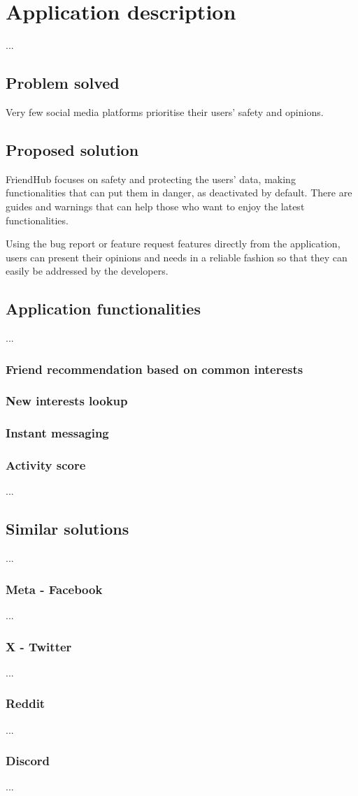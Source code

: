 \chapter{Application description}
...
    \section{Problem solved}
    Very few social media platforms prioritise their users' safety and opinions.
    
    \section{Proposed solution}
    FriendHub focuses on safety and protecting the users' data, making functionalities that can put them in danger, as deactivated by default. There are guides and warnings that can help those who want to enjoy the latest functionalities.

    Using the bug report or feature request features directly from the application, users can present their opinions and needs in a reliable fashion so that they can easily be addressed by the developers.
    \section{Application functionalities}
    ...
        \subsection{Friend recommendation based on common interests}
        \subsection{New interests lookup}
        \subsection{Instant messaging}
        \subsection{Activity score}
        ...
    \section{Similar solutions}
        ...
        \subsection{Meta - Facebook}
        ...
        \subsection{X - Twitter}
        ...
        \subsection{Reddit}
        ...
        \subsection{Discord}
        ...
\newpage